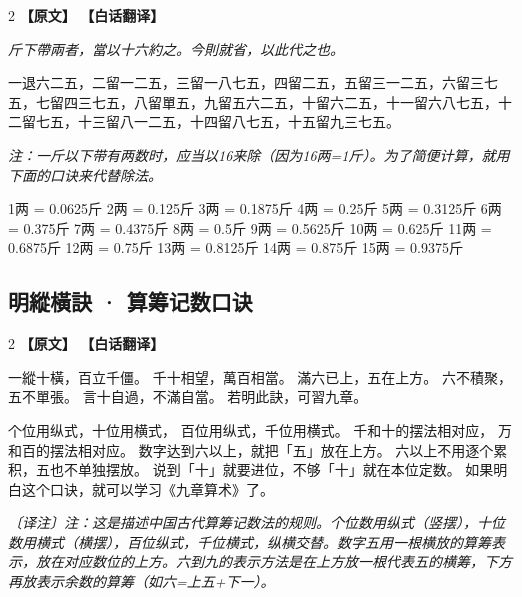 \documentclass[11pt,a4paper]{article}
\newcommand{\noteMOD}[1]{\par\textcolor{notecolor}{\small\textit{〔译注〕#1}}\par\smallskip}
\begin{document}
\begin{paracol}{2}
\noindent\textbf{\textcolor{leftlabel}{【原文】}}
\switchcolumn
\noindent\textcolor{rightlabel}{\textbf{【白话翻译】}}
\switchcolumn*

\textit{斤下帶兩者，當以十六約之。今則就省，以此代之也。}

\medskip

一退六二五，二留一二五，三留一八七五，四留二五，五留三一二五，六留三七五，七留四三七五，八留單五，九留五六二五，十留六二五，十一留六八七五，十二留七五，十三留八一二五，十四留八七五，十五留九三七五。

\switchcolumn

\textit{注：一斤以下带有两数时，应当以16来除（因为16两=1斤）。为了简便计算，就用下面的口诀来代替除法。}

\medskip

1两 = 0.0625斤\quad
2两 = 0.125斤\quad
3两 = 0.1875斤\quad
4两 = 0.25斤\quad
5两 = 0.3125斤\quad
6两 = 0.375斤\quad
7两 = 0.4375斤\quad
8两 = 0.5斤\quad
9两 = 0.5625斤\quad
10两 = 0.625斤\quad
11两 = 0.6875斤\quad
12两 = 0.75斤\quad
13两 = 0.8125斤\quad
14两 = 0.875斤\quad
15两 = 0.9375斤

\end{paracol}

\medskip

\subsection{明縱橫訣 · 算筹记数口诀}

\begin{paracol}{2}
\noindent\textbf{\textcolor{leftlabel}{【原文】}}
\switchcolumn
\noindent\textbf{\textcolor{rightlabel}{【白话翻译】}}
\switchcolumn*

一縱十橫，百立千僵。\break
千十相望，萬百相當。\break
滿六已上，五在上方。\break
六不積聚，五不單張。\break
言十自過，不滿自當。\break
若明此訣，可習九章。

\switchcolumn

个位用纵式，十位用横式，\break
百位用纵式，千位用横式。\break
千和十的摆法相对应，\break
万和百的摆法相对应。\break
数字达到六以上，就把「五」放在上方。\break
六以上不用逐个累积，五也不单独摆放。\break
说到「十」就要进位，不够「十」就在本位定数。\break
如果明白这个口诀，就可以学习《九章算术》了。

\noteMOD{注：这是描述中国古代算筹记数法的规则。个位数用纵式（竖摆），十位数用横式（横摆），百位纵式，千位横式，纵横交替。数字五用一根横放的算筹表示，放在对应数位的上方。六到九的表示方法是在上方放一根代表五的横筹，下方再放表示余数的算筹（如六=上五+下一）。}

\end{paracol}
\end{document}
